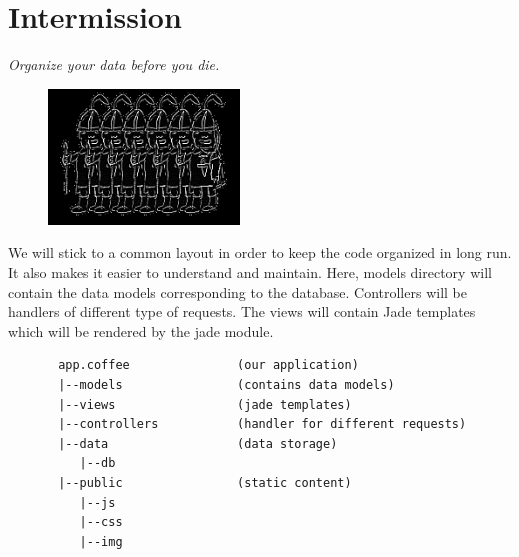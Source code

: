 \documentclass[12pt]{book}
\begin{document}




\chapter{Intermission}
\begin{flushright}\textit{Organize your data before you die.}\end{flushright}

\begin{figure}
\begin{center}\includegraphics[width=2in]{org/art/organized.png}\end{center}
\end{figure}

We will stick to a common layout in order to keep the code organized in long run. It also makes it easier to understand and maintain. Here, models directory will contain the data models corresponding to the database. Controllers will be handlers of different type of requests. The views will contain Jade templates which will be rendered by the jade module.
\linebreak

\begin{verbatim}
       app.coffee               (our application)
       |--models                (contains data models)
       |--views                 (jade templates)
       |--controllers           (handler for different requests)
       |--data                  (data storage)
          |--db
       |--public                (static content)
          |--js
          |--css
          |--img
\end{verbatim}

\par
\vspace{1cm}
\end{document}
